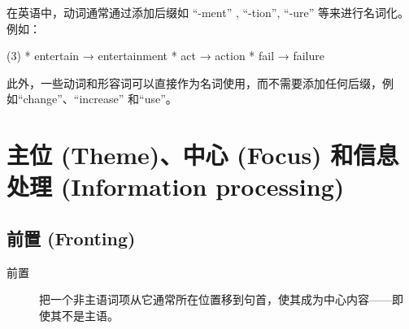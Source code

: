在英语中，动词通常通过添加后缀如 ``-ment'' , ``-tion'', ``-ure'' 等来进行名词化。例如：
\begin{taskitem}(3)
* entertain → entertainment
* act → action
* fail → failure
\end{taskitem}
此外，一些动词和形容词可以直接作为名词使用，而不需要添加任何后缀，例
如``change''、``increase'' 和``use''。

\section{主位 (Theme)、中心 (Focus) 和信息处理 (Information processing)}


\subsection{前置 (Fronting)}

\begin{description}
\item[前置] 把一个非主语词项从它通常所在位置移到句首，使其成为中心内容——即
  使其不是主语。
\end{description}

